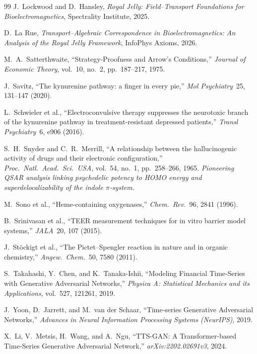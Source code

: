 \documentclass[12pt,oneside]{book}
\begin{document}
\begin{thebibliography}{99}
J.~Lockwood and D.~Hansley, \emph{Royal Jelly: Field--Transport Foundations for Bioelectromagnetics}, Spectrality Institute, 2025.

D.~La Rue, \emph{Transport--Algebraic Correspondence in Bioelectromagnetics: An Analysis of the Royal Jelly Framework}, InfoPhys Axioms, 2026.

M.~A.~Satterthwaite,
``Strategy-Proofness and Arrow's Conditions,''
\emph{Journal of Economic Theory}, vol.~10, no.~2, pp.~187--217, 1975.

J.~Savitz, ``The kynurenine pathway: a finger in every pie,'' \emph{Mol Psychiatry}\ 25, 131--147 (2020).

L.~Schwieler et al., ``Electroconvulsive therapy suppresses the neurotoxic branch of the kynurenine pathway in treatment-resistant depressed patients,'' \emph{Transl Psychiatry}\ 6, e906 (2016).

S.~H.~Snyder and C.~R.~Merrill,
``A relationship between the hallucinogenic activity of drugs and their electronic configuration,''
\emph{Proc.\ Natl.\ Acad.\ Sci.\ USA}, vol.~54, no.~1, pp.~258--266, 1965.
\textit{Pioneering QSAR analysis linking psychedelic potency to HOMO energy and superdelocalizability of the indole $\pi$-system.}

M.~Sono et al., ``Heme-containing oxygenases,'' \emph{Chem.\ Rev.}\ 96, 2841 (1996).

B.~Srinivasan et al., ``TEER measurement techniques for in vitro barrier model systems,'' \emph{JALA}\ 20, 107 (2015).

J.~St\"ockigt et al., ``The Pictet--Spengler reaction in nature and in organic chemistry,'' \emph{Angew.~Chem.}\ 50, 7580 (2011).

S.~Takahashi, Y.~Chen, and K.~Tanaka-Ishii,
``Modeling Financial Time-Series with Generative Adversarial Networks,''
\emph{Physica A: Statistical Mechanics and its Applications}, vol.~527, 121261, 2019.

J.~Yoon, D.~Jarrett, and M.~van der Schaar,
``Time-series Generative Adversarial Networks,''
\emph{Advances in Neural Information Processing Systems (NeurIPS)}, 2019.

X.~Li, V.~Metsis, H.~Wang, and A.~Ngu,
``TTS-GAN: A Transformer-based Time-Series Generative Adversarial Network,''
\emph{arXiv:2202.02691v3}, 2024.


\end{thebibliography}
\end{document}

